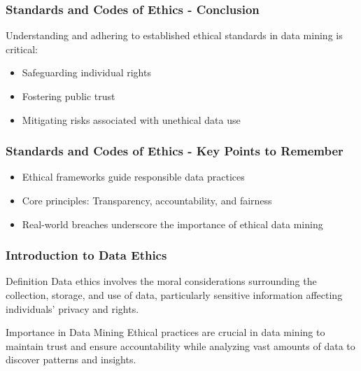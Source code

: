 \documentclass[aspectratio=169]{beamer}
\begin{document}
\begin{frame}[fragile]
    \frametitle{Standards and Codes of Ethics - Conclusion}
    Understanding and adhering to established ethical standards in data mining is critical:
    \begin{itemize}
        \item Safeguarding individual rights
        \item Fostering public trust
        \item Mitigating risks associated with unethical data use
    \end{itemize}
\end{frame}

\begin{frame}[fragile]
    \frametitle{Standards and Codes of Ethics - Key Points to Remember}
    \begin{itemize}
        \item Ethical frameworks guide responsible data practices
        \item Core principles: Transparency, accountability, and fairness
        \item Real-world breaches underscore the importance of ethical data mining
    \end{itemize}
\end{frame}

\begin{frame}[fragile]
    \frametitle{Introduction to Data Ethics}
    \begin{block}{Definition}
        Data ethics involves the moral considerations surrounding the collection, storage, and use of data, particularly sensitive information affecting individuals' privacy and rights.
    \end{block}
    \begin{block}{Importance in Data Mining}
        Ethical practices are crucial in data mining to maintain trust and ensure accountability while analyzing vast amounts of data to discover patterns and insights.
    \end{block}
\end{frame}
\end{document}
